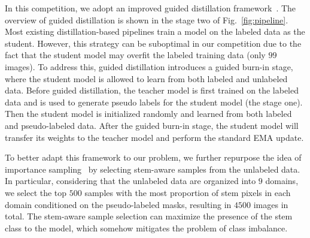 In this competition, %
we adopt an improved guided distillation framework~\cite{berrada2024guided}. The overview of guided distillation is shown in the stage two of Fig.~\ref{fig:pipeline}. %
Most existing distillation-based pipelines train a model on the labeled data as the student. However, this strategy %
can be suboptimal in our competition due to the fact that the student model %
may overfit the labeled training data (only $99$ images). To address this, guided distillation introduces a guided burn-in stage, %
where the student model is allowed to %
learn from both labeled and unlabeled data. Before guided distillation, the teacher model is first trained on the labeled data and is used to generate pseudo labels for the student model (the stage one). Then the student model is initialized randomly %
and learned from both labeled and pseudo-labeled data. After the guided burn-in stage, the student model will %
transfer its weights to the teacher model and perform the standard EMA update. %

To better adapt this framework to our problem, we further repurpose the idea of importance sampling~\cite{kirillov2020pointrend} by selecting stem-aware samples from the unlabeled data. In particular, considering that the unlabeled data are organized into $9$ domains, we select the top $500$ samples with the most proportion of stem pixels in each domain conditioned on the pseudo-labeled masks, resulting in $4500$ images in total. %
The stem-aware sample selection can maximize the presence of the stem class to the model, which somehow mitigates the problem of class imbalance.

